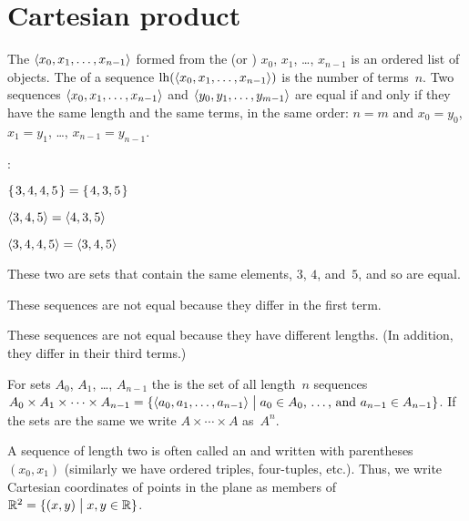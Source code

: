 \documentclass{ibl}  %
\begin{document}
\section{Cartesian product}

\begin{df}
The  $\langle x_0, x_1, \ldots, x_{n-1}\rangle$
formed from the  
(or ) $x_0$, $x_1$, \ldots, $x_{n-1}$ 
is an ordered list of objects.
The  of a sequence $\operatorname*{lh}(\langle x_0, x_1, \ldots, x_{n-1}\rangle)$
is the number of terms~$n$.
Two sequences $\langle x_0, x_1, \ldots, x_{n-1}\rangle$ and
$\langle y_0, y_1, \ldots, y_{m-1}\rangle$ are equal if and only if
they have the same length and
the same terms, in the same order:
$n=m$ and
$x_0=y_0$, $x_1=y_1$, \ldots, $x_{n-1}=y_{n-1}$. 
\end{df}

\begin{problem}\pord:
\begin{items}
\item $\mbox{$\{\hspace{0.1em}3, 4, 4, 5\hspace{0.1em}\}$}=\mbox{$\{\hspace{0.1em}4, 3, 5\hspace{0.1em}\}$}$
\item $\langle3, 4, 5\rangle=\langle4, 3, 5\rangle$
\item $\langle3, 4, 4, 5\rangle=\langle3,4,5\rangle$  
\end{items}
\begin{answer}
\begin{items}
\item These two are sets that contain the same elements, $3$, $4$, and~$5$,
  and so are equal.
\item These sequences are not equal because they differ in the first term.
\item These sequences are not equal because they have different lengths.
  (In addition, they differ in their third terms.)
\end{items}
\end{answer}
\end{problem}

\begin{df}
For sets $A_0$, $A_1$, \ldots, $A_{n-1}$
the  
is the set of all length~$n$ sequences
$A_0\times A_1\times \cdots \times A_{n-1}
  =\{\langle a_0,a_1,\ldots,a_{n-1}\rangle \bigm| \text{$a_0\in A_0$, \ldots, and~$a_{n-1}\in A_{n-1}$}\}$.
If the sets are the same we write $A\times\cdots\times A$ 
as~$A^n$.
\end{df}

A sequence of length two is often called an  and 
written with parentheses $(x_0,x_1)$
(similarly we have ordered triples, four-tuples, etc.).
Thus, we write 
Cartesian coordinates of points in the plane as members of
$\mathbb{R}^2=\{(x,y) \bigm| x,y\in\mathbb{R}\}$.
\end{document}
